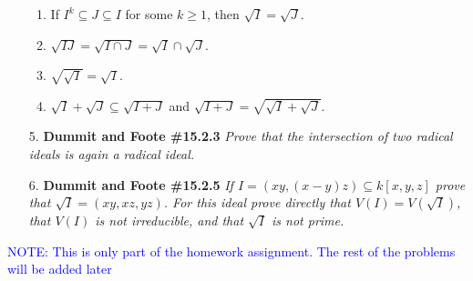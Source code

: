 \documentclass[12pt]{article}
\begin{document}
\begin{enumerate}
\begin{enumerate}
\item If $I^k\subseteq J\subseteq I$ for some $k\ge 1$, then $\sqrt{I}=\sqrt{J}$.

\item $\sqrt{IJ} = \sqrt{I\cap J} = \sqrt{I}\cap\sqrt{J}$.

\item $\sqrt{\sqrt{I}} = \sqrt{I}$.

\item $\sqrt{I}+\sqrt{J} \subseteq \sqrt{I+J}$ and $\sqrt{I+J} = \sqrt{\sqrt{I}+\sqrt{J}}$.

\end{enumerate}

\item[5.] \textbf{Dummit and Foote \#15.2.3} \textit{Prove that the intersection of two radical ideals is again a radical ideal.}

\item[6.] \textbf{Dummit and Foote \#15.2.5} \textit{If $I = (xy, (x - y)z) \subseteq k[x, y, z]$ prove that $\sqrt{I} = (xy, xz, yz)$. For this ideal prove
\emph{directly} that $V(I) = V(\sqrt{I})$, that $V(I)$ is not irreducible, and that $\sqrt{I}$ is not prime.}

\end{enumerate}

\textcolor{blue}{NOTE: This is only part of the homework assignment. The rest of the problems will be added later}
\end{document}
